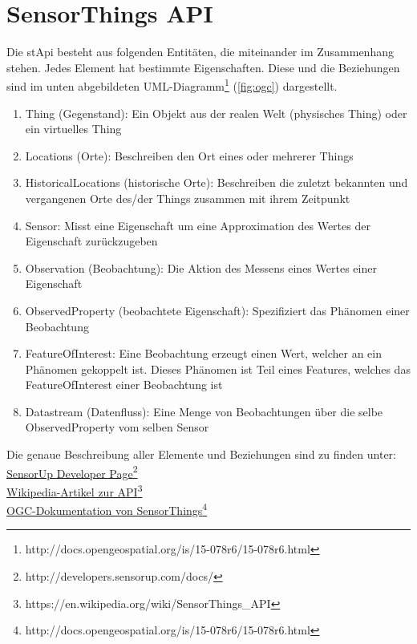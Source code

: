 \documentclass[a4paper, 12 pt]{article}
\begin{document}
\newpage
	\section{SensorThings API}

	Die \gls{stApi} besteht aus folgenden Entitäten, die miteinander im Zusammenhang stehen. Jedes Element hat bestimmte Eigenschaften. Diese und die Beziehungen sind im unten abgebildeten UML-Diagramm\footnote{http://docs.opengeospatial.org/is/15-078r6/15-078r6.html} (\cref{fig:ogc}) dargestellt. \\
	\begin{enumerate}
	
	\item Thing (Gegenstand): Ein Objekt aus der realen Welt (physisches Thing) oder ein virtuelles Thing
	\item Locations (Orte): Beschreiben den Ort eines oder mehrerer Things
	\item HistoricalLocations (historische Orte): Beschreiben die zuletzt bekannten und vergangenen Orte des/der Things zusammen mit ihrem Zeitpunkt
	\item Sensor: Misst eine Eigenschaft um eine Approximation des Wertes der Eigenschaft zurückzugeben
	\item Observation (Beobachtung): Die Aktion des Messens eines Wertes einer Eigenschaft
	\item ObservedProperty (beobachtete Eigenschaft): Spezifiziert das Phänomen einer Beobachtung
	\item FeatureOfInterest: Eine Beobachtung erzeugt einen Wert, welcher an ein Phänomen gekoppelt ist. Dieses Phänomen ist Teil eines Features, welches das FeatureOfInterest einer Beobachtung ist
	\item Datastream (Datenfluss): Eine Menge von Beobachtungen über die selbe ObservedProperty vom selben Sensor   
	\end{enumerate}
	Die genaue Beschreibung aller Elemente und Beziehungen sind zu finden unter: \\
	\href{http://developers.sensorup.com/docs/}{SensorUp Developer Page}\footnote{http://developers.sensorup.com/docs/}\\
	\href{https://en.wikipedia.org/wiki/SensorThings_API}{Wikipedia-Artikel zur API}\footnote{https://en.wikipedia.org/wiki/SensorThings\_API}\\
	\href{http://docs.opengeospatial.org/is/15-078r6/15-078r6.html}{OGC-Dokumentation von SensorThings}\footnote{http://docs.opengeospatial.org/is/15-078r6/15-078r6.html}\\
\end{document}
